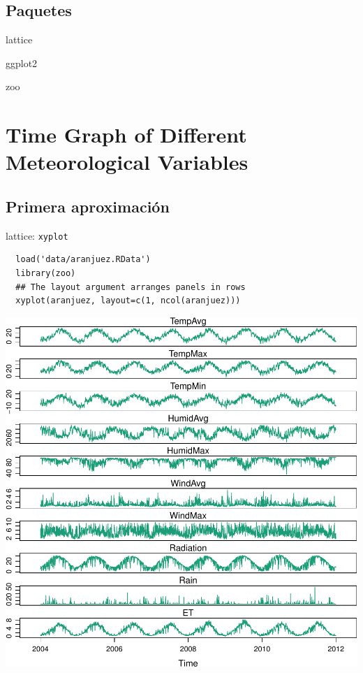 \documentclass[xcolor={usenames,svgnames,dvipsnames}]{beamer}
\begin{document}
\subsection{Paquetes}
\label{sec-1-2}
\begin{frame}[label=sec-1-2-1]{lattice}
\end{frame}
\begin{frame}[label=sec-1-2-2]{ggplot2}
\end{frame}
\begin{frame}[label=sec-1-2-3]{zoo}
\end{frame}

\section{Time Graph of Different Meteorological Variables}
\label{sec-2}

\subsection{Primera aproximación}
\label{sec-2-1}

\begin{frame}[fragile,label=sec-2-1-1]{lattice: \texttt{xyplot}}
 \lstset{language=R,label= ,caption= ,numbers=none}
\begin{lstlisting}
  load('data/aranjuez.RData')
  library(zoo)
  ## The layout argument arranges panels in rows
  xyplot(aranjuez, layout=c(1, ncol(aranjuez)))
\end{lstlisting}

\includegraphics[width=.9\linewidth]{figs/aranjuez.pdf}
\end{frame}
\end{document}
